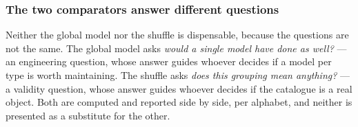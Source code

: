 \subsubsection*{The two comparators answer different questions}

Neither the global model nor the shuffle is dispensable, because the questions are not the same.
The global model asks \emph{would a single model have done as well?} --- an engineering question,
whose answer guides whoever decides if a model per type is worth maintaining. The shuffle asks
\emph{does this grouping mean anything?} --- a validity question, whose answer guides whoever
decides if the catalogue is a real object. Both are computed and reported side by side, per
alphabet, and neither is presented as a substitute for the other.
